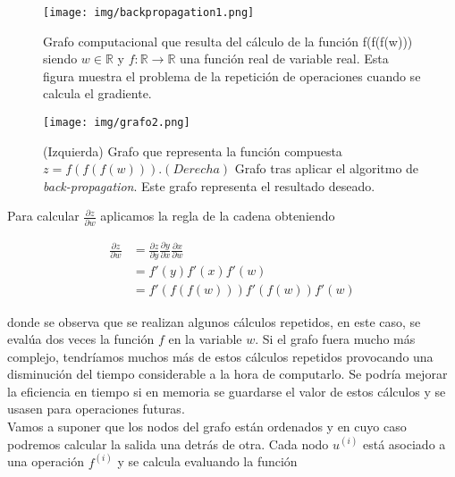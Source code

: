         \begin{figure}[htpb]
            \centering
            \texttt{[image: img/backpropagation1.png]}
            \caption{Grafo computacional que resulta del cálculo de la función f(f(f(w))) siendo $w \in \mathbb{R}$ y $f:\mathbb{R} \rightarrow \mathbb{R}$ una función real de variable real. Esta figura muestra el problema de la repetición de operaciones cuando se calcula el gradiente.}
            \label{fig:bp_grafo}
        \end{figure}
        
        \begin{figure}[htpb]
            \centering
            \texttt{[image: img/grafo2.png]}
            \caption{(Izquierda) Grafo que representa la función compuesta $z = f(f(f(w))). (Derecha)$ Grafo tras aplicar el algoritmo de \textit{back-propagation}. Este grafo representa el resultado deseado.}
            \label{fig:bp_grafo2}
        \end{figure}
        
    Para calcular $\frac{\partial z}{\partial w}$ aplicamos la regla de la cadena obteniendo
        
        \begin{equation}
            \begin{aligned}
                    \frac{\partial z}{\partial w} & = \frac{\partial z }{\partial y}\frac{\partial y}{\partial x}\frac{\partial x}{\partial w}\\
                    & = f'(y) f'(x) f'(w) \\
                    & = f'(f(f(w))) f'(f(w)) f'(w)
            \end{aligned}
        \end{equation}
        
    \noindent donde se observa que se realizan algunos cálculos repetidos, en este caso, se evalúa dos veces la función $f$ en la variable $w$. Si el grafo fuera mucho más complejo, tendríamos muchos más de estos cálculos repetidos provocando una disminución del tiempo considerable a la hora de computarlo. Se podría mejorar la eficiencia en tiempo si en memoria se guardarse el valor de estos cálculos y se usasen para operaciones futuras. \\
        
    Vamos a suponer que los nodos del grafo están ordenados y en cuyo caso podremos calcular la salida una detrás de otra. Cada nodo $u^{(i)}$ está asociado a una operación $f^{(i)}$ y se calcula evaluando la función 
        
